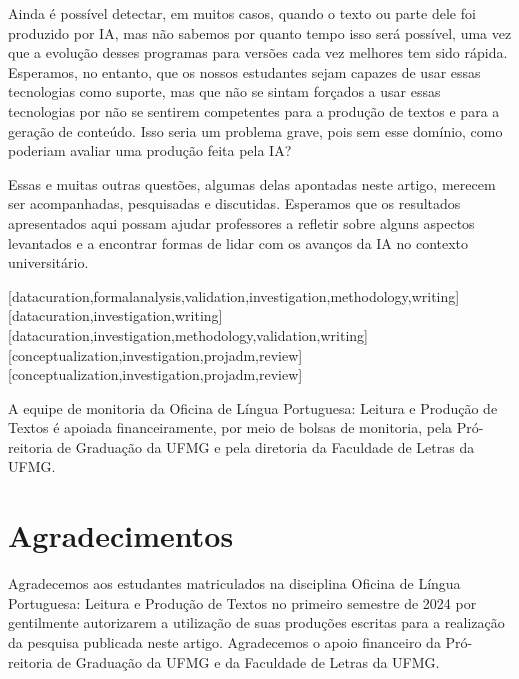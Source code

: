 \documentclass[portuguese]{textolivre}
\begin{document}
Ainda é possível detectar, em muitos casos, quando o texto ou parte dele foi produzido por IA, mas não sabemos por quanto tempo isso será possível, uma vez que a evolução desses programas para versões cada vez melhores tem sido rápida. Esperamos, no entanto, que os nossos estudantes sejam capazes de usar essas tecnologias como suporte, mas que não se sintam forçados a usar essas tecnologias por não se sentirem competentes para a produção de textos e para a geração de conteúdo. Isso seria um problema grave, pois sem esse domínio, como poderiam avaliar uma produção feita pela IA?

Essas e muitas outras questões, algumas delas apontadas neste artigo, merecem ser acompanhadas, pesquisadas e discutidas. Esperamos que os resultados apresentados aqui possam ajudar professores a refletir sobre alguns aspectos levantados e a encontrar formas de lidar com os avanços da IA no contexto universitário.
\printbibliography\label{sec-bib}


\begin{contributors}
[datacuration,formalanalysis,validation,investigation,methodology,writing]
[datacuration,investigation,writing]
[datacuration,investigation,methodology,validation,writing]
[conceptualization,investigation,projadm,review]
[conceptualization,investigation,projadm,review]
\end{contributors}

\begin{funding}
A equipe de monitoria da Oficina de Língua Portuguesa: Leitura e Produção de Textos é apoiada financeiramente, por meio de bolsas de monitoria, pela Pró-reitoria de Graduação da UFMG e pela diretoria da Faculdade de Letras da UFMG.
\end{funding}

\section*{Agradecimentos}
Agradecemos aos estudantes matriculados na disciplina Oficina de Língua Portuguesa: Leitura e Produção de Textos no primeiro semestre de 2024 por gentilmente autorizarem a utilização de suas produções escritas para a realização da pesquisa publicada neste artigo. Agradecemos o apoio financeiro da Pró-reitoria de Graduação da UFMG e da Faculdade de Letras da UFMG.

\begin{dataavailability}
\end{dataavailability}
\end{document}
